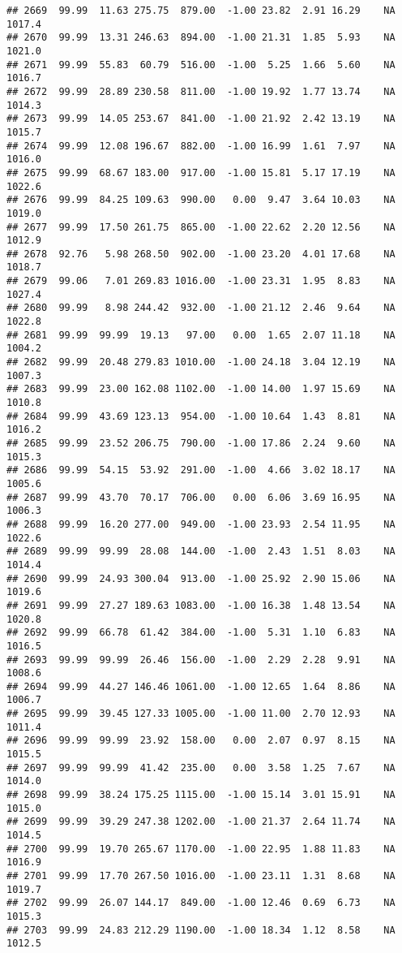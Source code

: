 \documentclass{article}\usepackage{graphicx, color}
\makeatletter
\newenvironment{kframe}{%
 \def\at@end@of@kframe{}%
 \ifinner\ifhmode%
  \def\at@end@of@kframe{\end{minipage}}%
  \begin{minipage}{\columnwidth}%
 \fi\fi%
 \def\FrameCommand##1{\hskip\@totalleftmargin \hskip-\fboxsep
 \colorbox{shadecolor}{##1}\hskip-\fboxsep
     \hskip-\linewidth \hskip-\@totalleftmargin \hskip\columnwidth}%
 \MakeFramed {\advance\hsize-\width
   \@totalleftmargin\z@ \linewidth\hsize
   \@setminipage}}%
 {\par\unskip\endMakeFramed%
 \at@end@of@kframe}
\newenvironment{knitrout}{}{} %
\makeatother
\begin{document}
\begin{knitrout}
\begin{kframe}
\begin{verbatim}
## 2669  99.99  11.63 275.75  879.00  -1.00 23.82  2.91 16.29    NA 1017.4
## 2670  99.99  13.31 246.63  894.00  -1.00 21.31  1.85  5.93    NA 1021.0
## 2671  99.99  55.83  60.79  516.00  -1.00  5.25  1.66  5.60    NA 1016.7
## 2672  99.99  28.89 230.58  811.00  -1.00 19.92  1.77 13.74    NA 1014.3
## 2673  99.99  14.05 253.67  841.00  -1.00 21.92  2.42 13.19    NA 1015.7
## 2674  99.99  12.08 196.67  882.00  -1.00 16.99  1.61  7.97    NA 1016.0
## 2675  99.99  68.67 183.00  917.00  -1.00 15.81  5.17 17.19    NA 1022.6
## 2676  99.99  84.25 109.63  990.00   0.00  9.47  3.64 10.03    NA 1019.0
## 2677  99.99  17.50 261.75  865.00  -1.00 22.62  2.20 12.56    NA 1012.9
## 2678  92.76   5.98 268.50  902.00  -1.00 23.20  4.01 17.68    NA 1018.7
## 2679  99.06   7.01 269.83 1016.00  -1.00 23.31  1.95  8.83    NA 1027.4
## 2680  99.99   8.98 244.42  932.00  -1.00 21.12  2.46  9.64    NA 1022.8
## 2681  99.99  99.99  19.13   97.00   0.00  1.65  2.07 11.18    NA 1004.2
## 2682  99.99  20.48 279.83 1010.00  -1.00 24.18  3.04 12.19    NA 1007.3
## 2683  99.99  23.00 162.08 1102.00  -1.00 14.00  1.97 15.69    NA 1010.8
## 2684  99.99  43.69 123.13  954.00  -1.00 10.64  1.43  8.81    NA 1016.2
## 2685  99.99  23.52 206.75  790.00  -1.00 17.86  2.24  9.60    NA 1015.3
## 2686  99.99  54.15  53.92  291.00  -1.00  4.66  3.02 18.17    NA 1005.6
## 2687  99.99  43.70  70.17  706.00   0.00  6.06  3.69 16.95    NA 1006.3
## 2688  99.99  16.20 277.00  949.00  -1.00 23.93  2.54 11.95    NA 1022.6
## 2689  99.99  99.99  28.08  144.00  -1.00  2.43  1.51  8.03    NA 1014.4
## 2690  99.99  24.93 300.04  913.00  -1.00 25.92  2.90 15.06    NA 1019.6
## 2691  99.99  27.27 189.63 1083.00  -1.00 16.38  1.48 13.54    NA 1020.8
## 2692  99.99  66.78  61.42  384.00  -1.00  5.31  1.10  6.83    NA 1016.5
## 2693  99.99  99.99  26.46  156.00  -1.00  2.29  2.28  9.91    NA 1008.6
## 2694  99.99  44.27 146.46 1061.00  -1.00 12.65  1.64  8.86    NA 1006.7
## 2695  99.99  39.45 127.33 1005.00  -1.00 11.00  2.70 12.93    NA 1011.4
## 2696  99.99  99.99  23.92  158.00   0.00  2.07  0.97  8.15    NA 1015.5
## 2697  99.99  99.99  41.42  235.00   0.00  3.58  1.25  7.67    NA 1014.0
## 2698  99.99  38.24 175.25 1115.00  -1.00 15.14  3.01 15.91    NA 1015.0
## 2699  99.99  39.29 247.38 1202.00  -1.00 21.37  2.64 11.74    NA 1014.5
## 2700  99.99  19.70 265.67 1170.00  -1.00 22.95  1.88 11.83    NA 1016.9
## 2701  99.99  17.70 267.50 1016.00  -1.00 23.11  1.31  8.68    NA 1019.7
## 2702  99.99  26.07 144.17  849.00  -1.00 12.46  0.69  6.73    NA 1015.3
## 2703  99.99  24.83 212.29 1190.00  -1.00 18.34  1.12  8.58    NA 1012.5

\end{verbatim}
\end{kframe}
\end{knitrout}
\end{document}
